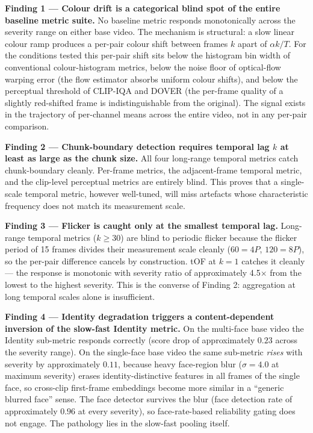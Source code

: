 \textbf{Finding 1 --- Colour drift is a categorical blind spot of the entire baseline
metric suite.} No baseline metric responds monotonically across the severity range on
either base video. The mechanism is structural: a slow linear colour ramp produces a
per-pair colour shift between frames $k$ apart of $\alpha k / T$. For the conditions
tested this per-pair shift sits below the histogram bin width of conventional
colour-histogram metrics, below the noise floor of optical-flow warping error (the flow
estimator absorbs uniform colour shifts), and below the perceptual threshold of CLIP-IQA
and DOVER (the per-frame quality of a slightly red-shifted frame is indistinguishable
from the original). The signal exists in the trajectory of per-channel means across the
entire video, not in any per-pair comparison.

\textbf{Finding 2 --- Chunk-boundary detection requires temporal lag $k$ at least as
large as the chunk size.} All four long-range temporal metrics catch chunk-boundary
cleanly. Per-frame metrics, the adjacent-frame temporal metric, and the clip-level
perceptual metrics are entirely blind. This proves that a single-scale temporal metric,
however well-tuned, will miss artefacts whose characteristic frequency does not match its
measurement scale.

\textbf{Finding 3 --- Flicker is caught only at the smallest temporal lag.} Long-range
temporal metrics ($k \geq 30$) are blind to periodic flicker because the flicker period
of 15 frames divides their measurement scale cleanly ($60 = 4P$, $120 = 8P$), so the
per-pair difference cancels by construction. tOF at $k=1$ catches it cleanly --- the
response is monotonic with severity ratio of approximately 4.5$\times$ from the lowest to
the highest severity. This is the converse of Finding 2: aggregation at long temporal
scales alone is insufficient.

\textbf{Finding 4 --- Identity degradation triggers a content-dependent inversion of the
slow-fast Identity metric.} On the multi-face base video the Identity sub-metric responds
correctly (score drop of approximately $0.23$ across the severity range). On the
single-face base video the same sub-metric \emph{rises} with severity by approximately
$0.11$, because heavy face-region blur ($\sigma = 4.0$ at maximum severity) erases
identity-distinctive features in all frames of the single face, so cross-clip first-frame
embeddings become more similar in a ``generic blurred face'' sense. The face detector
survives the blur (face detection rate of approximately $0.96$ at every severity), so
face-rate-based reliability gating does not engage. The pathology lies in the slow-fast
pooling itself.

